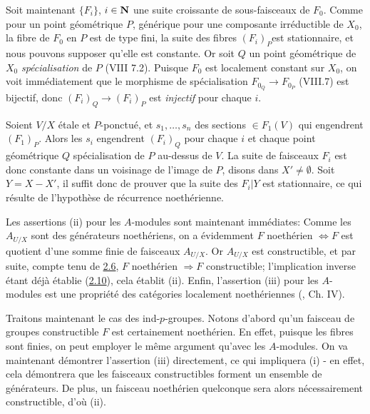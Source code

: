 \documentclass[10pt]{../fichiers-configuration-latex/smfart}
\begin{document}
Soit maintenant $\{F_i\}$, $i\in \mathbf{N}$ une suite
croissante de sous-faisceaux de $F_0$. Comme pour un point géométrique
$P$, générique pour une composante irréductible de $X_0$, la fibre de
$F_0$ en $P$ est de type fini, la suite des fibres
$(F_i)_P$\pageoriginale est stationnaire, et nous pouvons supposer
qu'elle est constante. Or soit $Q$ un point géométrique de $X_0$
\emph{spécialisation} de $P$ (VIII 7.2). Puisque $F_0$ est localement
constant sur $X_0$, on voit immédiatement que le morphisme de
spécialisation $F_{0_Q}\rightarrow F_{0_P}$ (VIII.7) est bijectif,
donc $(F_i)_Q\rightarrow (F_i)_P$ est \emph{injectif} pour chaque $i$.

Soient $V/X$ étale et $P$-ponctué, et $s_1,\ldots,s_n$ des sections
$\in F_1(V)$ qui engendrent $(F_1)_P$. Alors les $s_i$ engendrent
$(F_i)_Q$ pour chaque $i$ et chaque point géométrique $Q$
spécialisation de $P$ au-dessus de $V$. La suite de faisceaux $F_i$
est donc constante dans un voisinage de l'image de $P$, disons dans
$X'\neq ∅$. Soit $Y=X-X'$, il suffit donc de prouver que la suite
des $F_i| Y$ est stationnaire, ce qui résulte de l'hypothèse de
récurrence noethérienne.

Les assertions (ii) pour les $A$-modules sont maintenant immédiates:
Comme les $A_{U/X}$ sont des générateurs noethériens, on a évidemment
$F$ noethérien $\Leftrightarrow F$ est quotient d'une somme finie de
faisceaux $A_{U/X}$. Or $A_{U/X}$ est constructible, et par suite,
compte tenu de \hyperref[IX.prop2.6]{2.6}, $F$ noethérien $\Rightarrow F$ constructible;
l'implication inverse étant déjà établie (\hyperref[IX.lem2.10]{2.10}), cela établit
(ii). Enfin, l'assertion (iii) pour les $A$-modules est une propriété
des catégories localement noethériennes (\cf [1], Ch. IV).

Traitons maintenant le cas des ind-$p$-groupes. Notons d'abord qu'un
faisceau de groupes constructible $F$ est certainement noethérien. En
effet, puisque les fibres sont finies, on peut employer le même
argument qu'avec les $A$-modules. On va maintenant démontrer
l'assertion (iii) directement, ce qui impliquera (i) - en effet, cela
démontrera que les faisceaux constructibles forment un ensemble de
générateurs. De plus, un faisceau noethérien quelconque sera alors
nécessairement constructible, d'où (ii).
\end{document}
